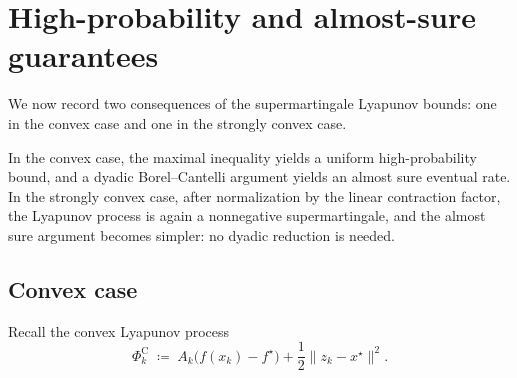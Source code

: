 \documentclass[10pt]{article}
\begin{document}
\section{High-probability and almost-sure guarantees}
\label{app:hp-as}

We now record two consequences of the supermartingale Lyapunov bounds: one in the convex case and one in the strongly convex case.

In the convex case, the maximal inequality yields a uniform high-probability bound, and a dyadic Borel--Cantelli argument yields an almost sure eventual rate.
In the strongly convex case, after normalization by the linear contraction factor, the Lyapunov process is again a nonnegative supermartingale, and the almost sure argument becomes simpler: no dyadic reduction is needed.


\subsection{Convex case}

Recall the convex Lyapunov process
\[
\Phi_k^{\mathrm C}
\;\coloneqq\;
A_k\bigl(f(x_k)-f^\star\bigr)
+\frac12\|z_k-x^\star\|^2.
\]
\end{document}

